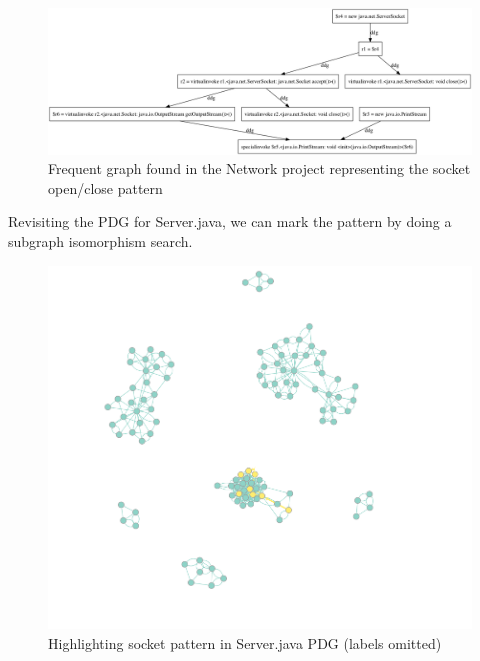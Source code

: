 \documentclass[12pt]{article}
\begin{document}
\begin{figure}[ht]
\centerline{
\includegraphics[width=\linewidth]{patterns/networking_pattern.png}
}
\caption{\label{socket_pattern}
    Frequent graph found in the Network project representing the socket open/close pattern
}
\end{figure}

Revisiting the PDG for Server.java, we can mark the pattern by doing a subgraph isomorphism search.

\begin{figure}[ht]
\centerline{
\includegraphics[width=\linewidth]{patterns/networking_isomorphism_full.png}
}
\caption{\label{networking_isomorphism}
    Highlighting socket pattern in Server.java PDG (labels omitted)
}
\end{figure}
\end{document}
